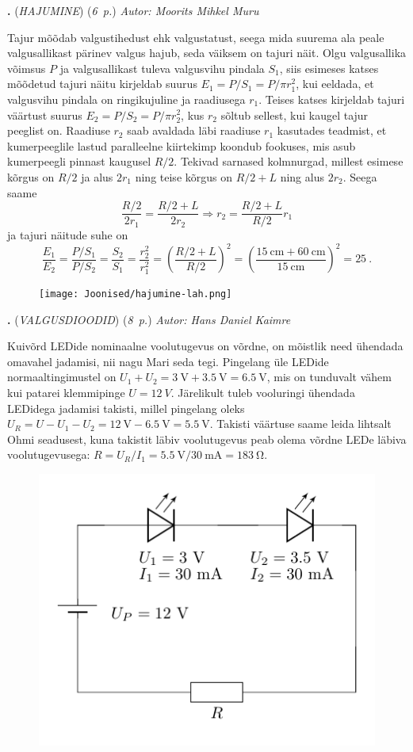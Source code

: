 \documentclass[11pt,a5paper]{article}
\newcommand{\numb}[1]{\vspace{5pt}\textbf{\large #1}}
\newcommand{\nimi}[1]{(\textsl{\small #1})}
\newcommand{\punktid}[1]{(\emph{#1~p.})}
\newcounter{ylesanne}
\newcommand{\yl}[1]{\addtocounter{ylesanne}{1}\numb{\theylesanne.} \nimi{#1} \newblock{}}
\newcommand{\autor}[1]{\emph{Autor: #1}}%
\begin{document}
\yl{HAJUMINE}
\punktid{6} \autor{Moorits Mihkel Muru}

Tajur mõõdab valgustihedust ehk valgustatust, seega mida suurema ala peale valgusallikast pärinev valgus hajub, seda väiksem on tajuri näit. Olgu valgusallika võimsus $P$ ja valgusallikast tuleva valgusvihu pindala $S_1$, siis esimeses katses mõõdetud tajuri näitu kirjeldab suurus $E_1 = P/S_1 = P/\pi r_1^2$, kui eeldada, et valgusvihu pindala on ringikujuline ja raadiusega $r_1$. Teises katses kirjeldab tajuri väärtust suurus $E_2 = P/S_2 = P/\pi r_2^2$, kus $r_2$ sõltub sellest, kui kaugel tajur peeglist on. Raadiuse $r_2$ saab avaldada läbi raadiuse $r_1$ kasutades teadmist, et kumerpeeglile lastud paralleelne kiirtekimp koondub fookuses, mis asub kumerpeegli pinnast kaugusel $R/2$. Tekivad sarnased kolmnurgad, millest esimese kõrgus on $R/2$ ja alus $2r_1$ ning teise kõrgus on $R/2 + L$ ning alus $2r_2$. Seega saame
$$ \frac{R/2}{2r_1} = \frac{R/2 + L}{2r_2} \Rightarrow r_2 = \frac{R/2 + L}{R/2} r_1$$
ja tajuri näitude suhe on
$$ \frac{E_1}{E_2} = \frac{P/S_1}{P/S_2} = \frac{S_2}{S_1} = \frac{r_2^2}{r_1^2} = \left(\frac{R/2 + L}{R/2}\right)^2 = \left(\frac{\SI{15}{\centi\meter} + \SI{60}{\centi\meter}}{\SI{15}{\centi\meter}}\right)^2 = 25 \ .$$

\begin{figure}[h]
    \centering
    \texttt{[image: Joonised/hajumine-lah.png]}
\end{figure}

\yl{VALGUSDIOODID}
\punktid{8} \autor{Hans Daniel Kaimre}

Kuivõrd LEDide nominaalne voolutugevus on võrdne, on mõistlik need ühendada omavahel jadamisi, nii nagu Mari seda tegi. Pingelang üle LEDide normaaltingimustel on $U_1+U_2=\SI{3}{\V}+\SI{3.5}{\V}=\SI{6.5}{\V}$, mis on tunduvalt vähem kui patarei klemmipinge $U=\SI{12}{V}$. Järelikult tuleb vooluringi ühendada LEDidega jadamisi takisti, millel pingelang oleks $U_R=U-U_1-U_2=\SI{12}{\V}-\SI{6.5}{\V}=\SI{5.5}{\V}$. Takisti väärtuse saame leida lihtsalt Ohmi seadusest, kuna takistit läbiv voolutugevus peab olema võrdne LEDe läbiva voolutugevusega: $R=U_R/I_1=\SI{5.5}{\V}/\SI{30}{\milli\A}=\SI{183}{\ohm}$.

\begin{figure}[h]
    \centering
    \includegraphics[width=0.5\linewidth]{Joonis_LEDid_lah.pdf}
\end{figure}
\end{document}
